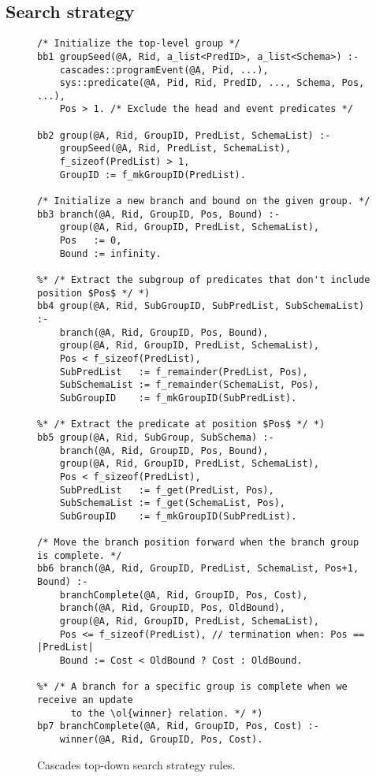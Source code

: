 \subsection{Search strategy}
\label{ch:opt:sec:cascades_search}

\begin{figure*}
\ssp
\centering
\begin{lstlisting}
/* Initialize the top-level group */
bb1 groupSeed(@A, Rid, a_list<PredID>, a_list<Schema>) :-
    cascades::programEvent(@A, Pid, ...),
    sys::predicate(@A, Pid, Rid, PredID, ..., Schema, Pos, ...),
    Pos > 1. /* Exclude the head and event predicates */

bb2 group(@A, Rid, GroupID, PredList, SchemaList) :-
    groupSeed(@A, Rid, PredList, SchemaList),
    f_sizeof(PredList) > 1,
    GroupID := f_mkGroupID(PredList).

/* Initialize a new branch and bound on the given group. */
bb3 branch(@A, Rid, GroupID, Pos, Bound) :-
    group(@A, Rid, GroupID, PredList, SchemaList),
    Pos   := 0,
    Bound := infinity.

%* /* Extract the subgroup of predicates that don't include position $Pos$ */ *)
bb4 group(@A, Rid, SubGroupID, SubPredList, SubSchemaList) :-
    branch(@A, Rid, GroupID, Pos, Bound),
    group(@A, Rid, GroupID, PredList, SchemaList),
    Pos < f_sizeof(PredList),
    SubPredList   := f_remainder(PredList, Pos),
    SubSchemaList := f_remainder(SchemaList, Pos),
    SubGroupID    := f_mkGroupID(SubPredList).

%* /* Extract the predicate at position $Pos$ */ *)
bb5 group(@A, Rid, SubGroup, SubSchema) :-
    branch(@A, Rid, GroupID, Pos, Bound),
    group(@A, Rid, GroupID, PredList, SchemaList),
    Pos < f_sizeof(PredList),
    SubPredList   := f_get(PredList, Pos),
    SubSchemaList := f_get(SchemaList, Pos),
    SubGroupID    := f_mkGroupID(SubPredList).

/* Move the branch position forward when the branch group is complete. */
bb6 branch(@A, Rid, GroupID, PredList, SchemaList, Pos+1, Bound) :-
    branchComplete(@A, Rid, GroupID, Pos, Cost),
    branch(@A, Rid, GroupID, Pos, OldBound),
    group(@A, Rid, GroupID, PredList, SchemaList),
    Pos <= f_sizeof(PredList), // termination when: Pos == |PredList|
    Bound := Cost < OldBound ? Cost : OldBound.

%* /* A branch for a specific group is complete when we receive an update 
      to the \ol{winner} relation. */ *)
bp7 branchComplete(@A, Rid, GroupID, Pos, Cost) :-
    winner(@A, Rid, GroupID, Pos, Cost).
\end{lstlisting}
\caption{\label{ch:opt:fig:cascades_top_down} Cascades top-down search strategy rules.}
\end{figure*}

